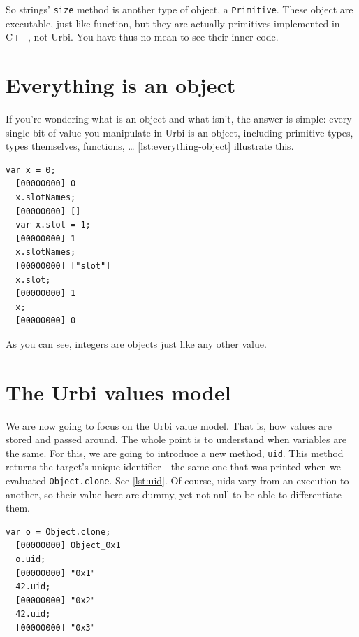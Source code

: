 \documentclass[openright,twoside,12pt]{report}
\newcommand{\Cxx}{C++\xspace}
\newcommand{\urbi}{Urbi\xspace}
\newcommand{\lst}[1]{\autoref{lst:#1}}
\begin{document}
So strings' \texttt{size} method is another type of object, a
\texttt{Primitive}. These object are executable, just like function,
but they are actually primitives implemented in \Cxx, not \urbi. You
have thus no mean to see their inner code.

\section{Everything is an object}

If you're wondering what is an object and what isn't, the answer is
simple: every single bit of value you manipulate in \urbi is an
object, including primitive types, types themselves, functions, \ldots
\lst{everything-object} illustrate this.

\begin{lstlisting}[caption=Everything is an object,
  label=lst:everything-object]
  var x = 0;
  [00000000] 0
  x.slotNames;
  [00000000] []
  var x.slot = 1;
  [00000000] 1
  x.slotNames;
  [00000000] ["slot"]
  x.slot;
  [00000000] 1
  x;
  [00000000] 0
\end{lstlisting}

As you can see, integers are objects just like any other value.

\section{The \urbi values model}

We are now going to focus on the \urbi value model. That is, how
values are stored and passed around. The whole point is to understand
when variables are the same. For this, we are going to introduce a new
method, \texttt{uid}. This method returns the target's unique
identifier - the same one that was printed when we evaluated
\lstinline|Object.clone|. See \lst{uid}. Of course, uids vary from an
execution to another, so their value here are dummy, yet not null to
be able to differentiate them.

\begin{lstlisting}[caption=Uids, label=lst:uid]
  var o = Object.clone;
  [00000000] Object_0x1
  o.uid;
  [00000000] "0x1"
  42.uid;
  [00000000] "0x2"
  42.uid;
  [00000000] "0x3"
\end{lstlisting}
\end{document}

